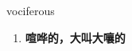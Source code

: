 
\begin{frame}
{\huge vociferous}
\begin{center}
\begin{enumerate}\Large
  \item \textbf{喧哗的，大叫大嚷的}
\end{enumerate}
\end{center}
\end{frame}
